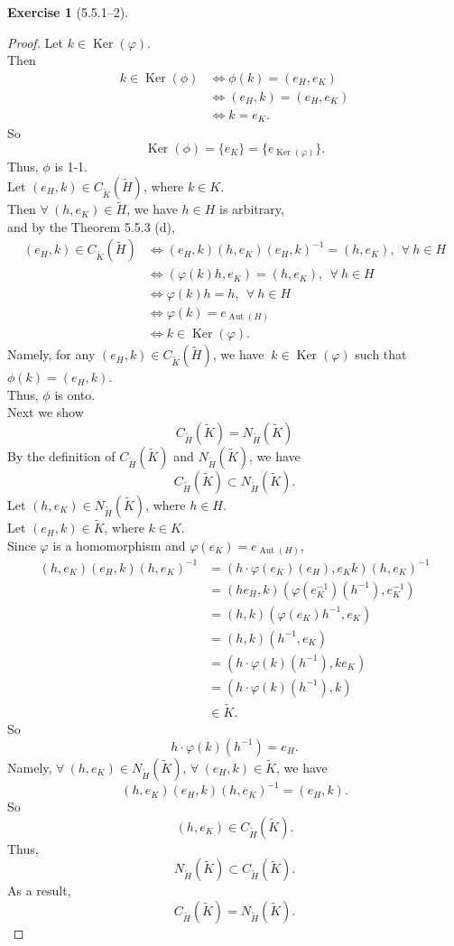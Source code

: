 \documentclass{amsart}
\renewcommand{\ker}{\operatorname{Ker}}
\newcommand{\wti}{\widetilde}
\theoremstyle{plain}
\theoremstyle{definition}
\newtheorem{exer}[lem]{Exercise}
\begin{document}
\begin{exer}[5.5.1--2]
\begin{proof}
	Let $k \in \ker(\varphi)$.\\
	Then
	\begin{align*}
	  k \in \ker(\phi) &\Leftrightarrow \phi(k) = (e_H,e_K) \\
	 				   &\Leftrightarrow (e_H,k) = (e_H,e_K) \\
	  				   &\Leftrightarrow k = e_K.
	\end{align*}
   So 
   \[\ker(\phi) = \{e_K\} = \{e_{\ker(\varphi)}\}.\]
   Thus, $\phi$ is 1-1.\\
   Let $(e_H,k) \in C_{\wti K}(\wti H)$, where $k \in K$.\\
   Then $\forall\ (h,e_K) \in \wti H$, we have $h\in H$ is arbitrary,\\
   and by the Theorem 5.5.3 (d),
   \begin{align*}
   	 (e_H,k) \in C_{\wti K}(\wti H) &\Leftrightarrow  (e_H,k) (h,e_K)(e_H,k)^{-1}  = (h,e_K), \ \ \forall\ h \in H\\
   	 								&\Leftrightarrow (\varphi(k)h,e_K) = (h,e_K), \ \ \forall\ h \in H\\
   	 								&\Leftrightarrow \varphi(k)h = h, \ \ \forall\ h \in H\\
   	 								&\Leftrightarrow \varphi(k) = e_{\operatorname{Aut}(H)}\\
  									&\Leftrightarrow k \in \ker(\varphi).
   \end{align*}
  	Namely, for any $(e_H,k) \in C_{\wti K}(\wti H)$, we have $\ k \in \ker(\varphi)$ such that $\phi(k) = (e_H,k)$.\\
  	Thus, $\phi$ is onto.\\
  	Next we show 
  	\[C_{\wti H}(\wti K) = N_{\wti H}(\wti K)\]
  	By the definition of $C_{\wti H}(\wti K)$ and $N_{\wti H}(\wti K)$, we have
  	\[C_{\wti H}(\wti K) \subset N_{\wti H}(\wti K).\]
  	Let $(h,e_K) \in N_{\wti H}(\wti K)$, where $h \in H$.\\
  	Let $(e_H,k) \in \wti K$, where $k \in K$.\\ 
  	Since $\varphi$ is a homomorphism and $\varphi(e_K) = e_{\operatorname{Aut}(H)}$,
	\begin{align*}
	   		  (h,e_K) (e_H,k)(h,e_K)^{-1} &=(h\cdot \varphi(e_K)(e_H),e_Kk)(h,e_K)^{-1} \\
			   &=(he_H,k)\left(\varphi(e_K^{-1})(h^{-1}),e_K^{-1}\right)\\
			   &=(h,k)(\varphi(e_K)h^{-1},e_K)\\
	  			&=(h,k)\left(h^{-1},e_K\right)\\
	  		    &=\left(h\cdot\varphi(k)(h^{-1}),ke_K\right)\\
	  			&=\left(h\cdot\varphi(k)(h^{-1}),k\right)\\
	  		  	&\in \wti K.
	\end{align*}
	So
	\[h\cdot\varphi(k)(h^{-1}) = e_H.\]
	Namely, $\forall\ (h,e_K) \in N_{\wti H}(\wti K)$, $\forall\ (e_H,k)\in \wti K$, we have
	\[(h,e_K) (e_H,k)(h,e_K)^{-1} = \left(e_H,k\right).\]
	So
	\[(h,e_K) \in C_{\wti H}(\wti K).\]
	Thus,
	\[N_{\wti H}(\wti K) \subset C_{\wti H}(\wti K).\]
	As a result,
	\[C_{\wti H}(\wti K) = N_{\wti H}(\wti K).\]
\end{proof}



\end{exer}
\end{document}
